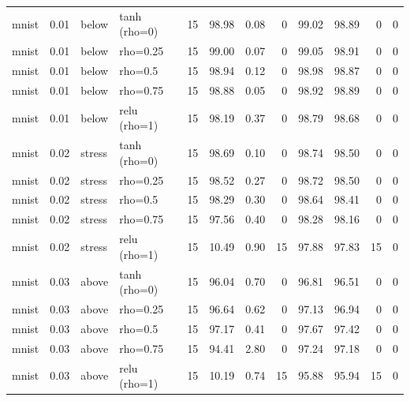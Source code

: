 \begin{table}[htbp]
{\begin{tabular}{@{}lrllrrrrrrrr@{}}
mnist & 0.01 & below & tanh (rho=0) & 15 & 98.98 & 0.08 & 0 & 99.02 & 98.89 & 0 & 0 \\
mnist & 0.01 & below & rho=0.25 & 15 & 99.00 & 0.07 & 0 & 99.05 & 98.91 & 0 & 0 \\
mnist & 0.01 & below & rho=0.5 & 15 & 98.94 & 0.12 & 0 & 98.98 & 98.87 & 0 & 0 \\
mnist & 0.01 & below & rho=0.75 & 15 & 98.88 & 0.05 & 0 & 98.92 & 98.89 & 0 & 0 \\
mnist & 0.01 & below & relu (rho=1) & 15 & 98.19 & 0.37 & 0 & 98.79 & 98.68 & 0 & 0 \\
mnist & 0.02 & stress & tanh (rho=0) & 15 & 98.69 & 0.10 & 0 & 98.74 & 98.50 & 0 & 0 \\
mnist & 0.02 & stress & rho=0.25 & 15 & 98.52 & 0.27 & 0 & 98.72 & 98.50 & 0 & 0 \\
mnist & 0.02 & stress & rho=0.5 & 15 & 98.29 & 0.30 & 0 & 98.64 & 98.41 & 0 & 0 \\
mnist & 0.02 & stress & rho=0.75 & 15 & 97.56 & 0.40 & 0 & 98.28 & 98.16 & 0 & 0 \\
mnist & 0.02 & stress & relu (rho=1) & 15 & 10.49 & 0.90 & 15 & 97.88 & 97.83 & 15 & 0 \\
mnist & 0.03 & above & tanh (rho=0) & 15 & 96.04 & 0.70 & 0 & 96.81 & 96.51 & 0 & 0 \\
mnist & 0.03 & above & rho=0.25 & 15 & 96.64 & 0.62 & 0 & 97.13 & 96.94 & 0 & 0 \\
mnist & 0.03 & above & rho=0.5 & 15 & 97.17 & 0.41 & 0 & 97.67 & 97.42 & 0 & 0 \\
mnist & 0.03 & above & rho=0.75 & 15 & 94.41 & 2.80 & 0 & 97.24 & 97.18 & 0 & 0 \\
mnist & 0.03 & above & relu (rho=1) & 15 & 10.19 & 0.74 & 15 & 95.88 & 95.94 & 15 & 0 \\
\bottomrule
\end{tabular}}
\end{table}
